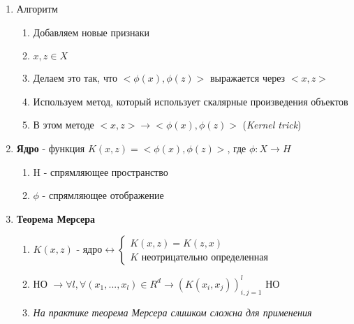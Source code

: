 \documentclass[a4paper, 12pt]{article}
\begin{document}
\begin{enumerate}
    \item Алгоритм
    \begin{enumerate}
        \item Добавляем новые признаки
        \item $x, z \in X$
        \item Делаем это так, что $<\phi(x), \phi(z)>$ выражается через $<x, z>$
        \item Используем метод, который использует скалярные произведения объектов
        \item В этом методе $<x, z> \rightarrow <\phi(x), \phi(z)>$ (\textit{Kernel trick})
    \end{enumerate}
    \item \textbf{Ядро} - функция $K(x, z) = <\phi(x), \phi(z)>$, где $\phi: X \to H$
    \begin{enumerate}
        \item H - спрямляющее пространство
        \item $\phi$ - спрямляющее отображение
    \end{enumerate}
    
    \item \textbf{Теорема Мерсера}
    \begin{enumerate}
        \item $K(x, z) \text{ - ядро} \leftrightarrow \begin{cases}
        K(x, z) = K(z, x) \\ K \text{ неотрицательно определенная}
        \end{cases}$
        \item НО $ \rightarrow \forall l, \forall (x_{1}, ..., x_{l}) \in R^{d} \rightarrow (K(x_{i}, x_{j}))^{l}_{i, j = 1} \text{ НО}$
        \item \textit{На практике теорема Мерсера слишком сложна для применения}
    \end{enumerate}
    

\end{enumerate}
\end{document}
